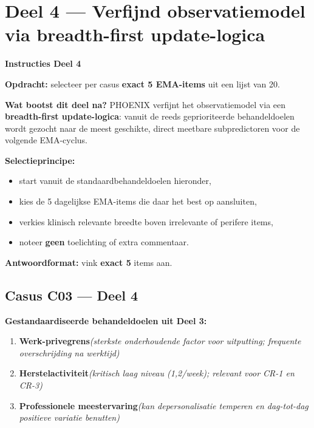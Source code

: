 \documentclass[11pt,a4paper]{article}
\begin{document}
\vspace{0.6em}
\newpage


\section{Deel 4 --- Verfijnd observatiemodel via breadth-first update-logica}

\begin{tcolorbox}[colback=purple!4,colframe=RichPurple,arc=2.5mm,boxrule=0.9pt,
  left=10pt,right=10pt,top=9pt,bottom=9pt]
\textbf{\color{RichPurple}Instructies Deel 4}

\smallskip\small
\textbf{Opdracht:} selecteer per casus \textbf{exact 5 EMA-items} uit een lijst van 20.

\textbf{Wat bootst dit deel na?}
PHOENIX verfijnt het observatiemodel via een \textbf{breadth-first update-logica}: vanuit de
reeds geprioriteerde behandeldoelen wordt gezocht naar de meest geschikte, direct meetbare
subpredictoren voor de volgende EMA-cyclus.

\textbf{Selectieprincipe:}
\begin{itemize}[topsep=2pt,itemsep=1pt]
\item start vanuit de standaardbehandeldoelen hieronder,
\item kies de 5 dagelijkse EMA-items die daar het best op aansluiten,
\item verkies klinisch relevante breedte boven irrelevante of perifere items,
\item noteer \textbf{geen} toelichting of extra commentaar.
\end{itemize}

\textbf{Antwoordformat:} vink \textbf{exact 5} items aan.
\end{tcolorbox}

\vspace{0.5em}
\subsection*{Casus C03 --- Deel 4}

\begin{contextbox}
\small\textbf{Gestandaardiseerde behandeldoelen uit Deel 3:}
\begin{enumerate}[topsep=2pt,itemsep=1pt,label=\arabic*.]
\item \textbf{Werk-privegrens}\quad\textit{\small (sterkste onderhoudende factor voor uitputting; frequente overschrijding na werktijd)}
\item \textbf{Herstelactiviteit}\quad\textit{\small (kritisch laag niveau (1,2/week); relevant voor CR-1 en CR-3)}
\item \textbf{Professionele meestervaring}\quad\textit{\small (kan depersonalisatie temperen en dag-tot-dag positieve variatie benutten)}
\end{enumerate}
\end{contextbox}
\end{document}
